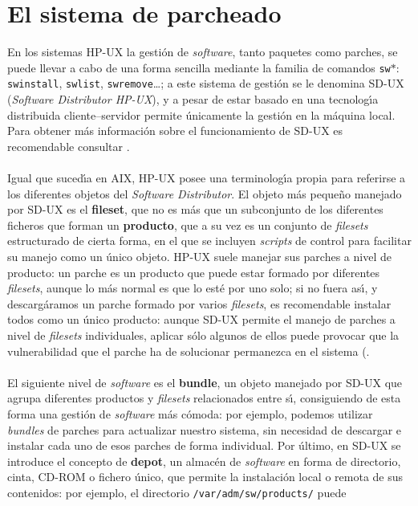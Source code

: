 \section{El sistema de parcheado}
En los sistemas HP-UX la gesti\'on de {\it software}, tanto paquetes como 
parches, se puede llevar a cabo de una forma sencilla mediante la familia de 
comandos {\tt sw$\ast$}: {\tt swinstall}, {\tt swlist}, {\tt swremove}\ldots; a
este sistema de gesti\'on se le denomina SD-UX ({\it Software Distributor 
HP-UX}), y a pesar de estar basado en una tecnolog\'{\i}a distribuida 
cliente--servidor permite \'unicamente la gesti\'on en la m\'aquina local. Para
obtener m\'as informaci\'on sobre el funcionamiento de SD-UX es recomendable
consultar \cite{kn:hp96}.\\
\\Igual que suced\'{\i}a en AIX, HP-UX posee una terminolog\'{\i}a propia para
referirse a los diferentes objetos del {\it Software Distributor}. El objeto
m\'as peque\~no manejado por SD-UX es el {\bf fileset}, que no es m\'as que un
subconjunto de los diferentes ficheros que forman un {\bf producto}, que a su
vez es un conjunto de {\it filesets} estructurado de cierta forma, en el que se
incluyen {\it scripts} de control para facilitar su manejo como un \'unico 
objeto. HP-UX suele manejar sus parches a nivel de
producto: un parche es un producto que puede estar formado por diferentes {\it
filesets}, aunque lo m\'as normal es que lo est\'e por uno solo; si no fuera 
as\'{\i}, y descarg\'aramos un parche formado por varios {\it filesets}, es 
recomendable instalar todos como un \'unico producto: aunque SD-UX permite 
el manejo de parches a nivel de {\it filesets} individuales, aplicar s\'olo
algunos de ellos puede provocar que la vulnerabilidad que el parche ha de 
solucionar permanezca en el sistema (\cite{kn:hp00b}.\\
\\El siguiente nivel de {\it software} es el {\bf bundle}, un objeto manejado
por SD-UX que agrupa diferentes productos y {\it filesets} relacionados entre
s\'{\i}, consiguiendo de esta forma una gesti\'on de {\it software} m\'as 
c\'omoda: por ejemplo, podemos utilizar {\it bundles} de parches para 
actualizar nuestro sistema, sin necesidad de descargar e instalar cada uno de 
esos parches de forma individual. Por \'ultimo, en SD-UX se introduce el 
concepto de {\bf depot}, un almac\'en de {\it software} en forma de directorio,
cinta, CD-ROM o fichero \'unico, que permite la instalaci\'on local o remota de
sus contenidos: por ejemplo, el directorio {\tt /var/adm/sw/products/} puede
